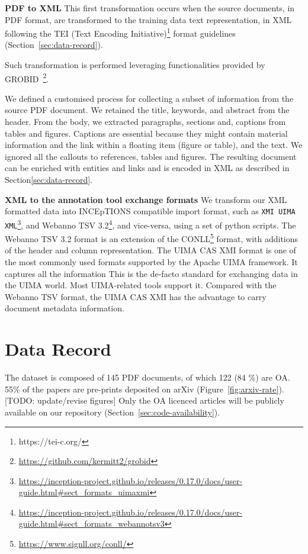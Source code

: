 \documentclass[fleqn,10pt]{wlscirep}
\begin{document}
\textbf{PDF to XML}
This first transformation occurs when the source documents, in PDF format, are transformed to the training data text representation, in XML following the TEI (Text Encoding Initiative)\footnote{https://tei-c.org/} format guidelines (Section~\ref{sec:data-record}).  

Such transformation is performed leveraging functionalities provided by GROBID~\footnote{\url{https://github.com/kermitt2/grobid}}.

We defined a customised process for collecting a subset of information from the source PDF document.
We retained the title, keywords, and abstract from the header. 
From the body, we extracted paragraphs, sections and, captions from tables and figures. 
Captions are essential because they might contain material information and the link within a floating item (figure or table), and the text. 
We ignored all the callouts to references, tables and figures. 
The resulting document can be enriched with entities and links and is encoded in XML as described in Section\ref{sec:data-record}. 

\textbf{XML to the annotation tool exchange formats}
We transform our XML formatted data into INCEpTIONS compatible import format, such as \texttt{XMI UIMA XML}\footnote{\url{https://inception-project.github.io/releases/0.17.0/docs/user-guide.html\#sect_formats_uimaxmi}}, and Webanno TSV 3.2\footnote{\url{https://inception-project.github.io/releases/0.17.0/docs/user-guide.html\#sect_formats_webannotsv3}}, and vice-versa, using a set of python scripts. 
The Webanno TSV 3.2 format is an extension of the CONLL\footnote{\url{https://www.signll.org/conll/}} format, with additions of the header and column representation.
The UIMA CAS XMI format is one of the most commonly used formats supported by the Apache UIMA framework. It captures all the information This is the de-facto standard for exchanging data in the UIMA world. Most UIMA-related tools support it. 
Compared with the Webanno TSV format, the UIMA CAS XMI has the advantage to carry document metadata information. 

\section*{Data Record}
\label{sec:data-record}
The dataset is composed of 145 PDF documents, of which 122 (84 \%) are OA. 55\% of the papers are pre-prints deposited on arXiv (Figure~\ref{fig:arxiv-rate}). [TODO: update/revise figures]
Only the OA licenced articles will be publicly available on our repository (Section~\ref{sec:code-availability}). 
\end{document}
